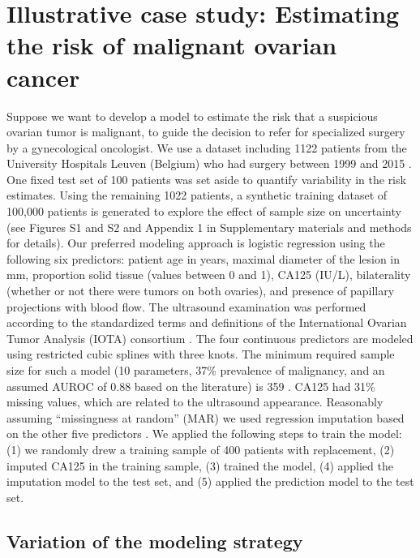 \section{Illustrative case study: Estimating the risk of malignant ovarian cancer }

Suppose we want to develop a model to estimate the risk that a suspicious ovarian tumor is malignant, to guide the decision to refer for specialized surgery by a gynecological oncologist. We use a dataset including 1122 patients from the University Hospitals Leuven (Belgium) who had surgery between 1999 and 2015 \cite{vancalsterEvaluatingRiskOvarian2014,vancalsterValidationModelsDiagnose2020}. One fixed test set of 100 patients was set aside to quantify variability in the risk estimates. Using the remaining 1022 patients, a synthetic training dataset of 100,000 patients is generated to explore the effect of sample size on uncertainty (see Figures S1 and S2 and Appendix 1 in Supplementary materials and methods for details).
Our preferred modeling approach is logistic regression using the following six predictors: patient age in years, maximal diameter of the lesion in mm, proportion solid tissue (values between 0 and 1), CA125 (IU/L), bilaterality (whether or not there were tumors on both ovaries), and presence of papillary projections with blood flow. The ultrasound examination was performed according to the standardized terms and definitions of the International Ovarian Tumor Analysis (IOTA) consortium \cite{timmermanTermsDefinitionsMeasurements2000}. The four continuous predictors are modeled using restricted cubic splines with three knots. The minimum required sample size for such a model (10 parameters, 37\% prevalence of malignancy, and an assumed AUROC of 0.88 based on the literature) is 359 \cite{rileyMinimumSampleSize2021,vanholsbekeExternalValidationDiagnostic2012}. CA125 had 31\% missing values, which are related to the ultrasound appearance. Reasonably assuming \enquote{missingness at random} (MAR) we used regression imputation based on the other five predictors \cite{siskImputationMissingIndicators2023}. 
We applied the following steps to train the model: (1) we randomly drew a training sample of 400 patients with replacement, (2) imputed CA125 in the training sample, (3) trained the model, (4) applied the imputation model to the test set, and (5) applied the prediction model to the test set. 

\subsection{Variation of the modeling strategy}

